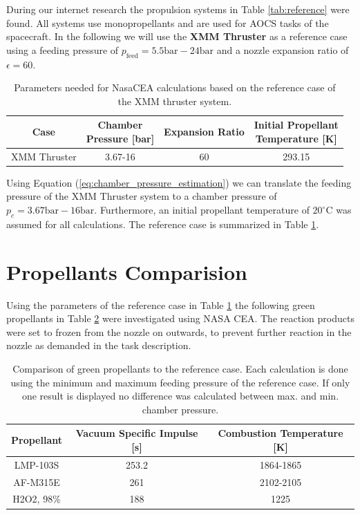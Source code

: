 \documentclass[12pt]{article}
\begin{document}
During our internet research the propulsion systems in Table \ref{tab:reference} were found. All systems use monopropellants and are used for AOCS tasks of the spacecraft. In the following we will use the \textbf{XMM Thruster} as a reference case using a feeding pressure of $p_{\text{feed}}=5.5\text{bar}-24\text{bar}$ and a nozzle expansion ratio of $\epsilon=60$.\\

\begin{table}[h!]
	\centering
	\begin{tabular}{|c|c|c|c|}
		\hline
		Case & \makecell{Chamber\\ Pressure {[}bar{]}} & Expansion Ratio & \makecell{Initial Propellant\\ Temperature {[}K{]}} \\ \hline
		XMM Thruster                      &        3.67-16         &  60   &              293.15                      \\ \hline
	\end{tabular}
	\caption{Parameters needed for NasaCEA calculations based on the reference case of the XMM thruster system.}
	\label{tab:selected_reference_case}
\end{table}

Using Equation (\ref{eq:chamber_pressure_estimation}) we can translate the feeding pressure of the XMM Thruster system to a chamber pressure of $p_{c}=3.67\text{bar}-16\text{bar}$. Furthermore, an initial propellant temperature of $20^\circ\text{C}$ was assumed for all calculations. The reference case is summarized in Table \ref{tab:selected_reference_case}.
 
\section{Propellants Comparision}
Using the parameters of the reference case in Table \ref{tab:selected_reference_case} the following green propellants in Table \ref{tab:comparison} were investigated using NASA CEA. The reaction products were set to frozen from the nozzle on outwards, to prevent further reaction in the nozzle as demanded in the task description.

\begin{table}[!h]
	\centering
	\begin{tabular}{|c|c|c|}
		\hline
		Propellant & Vacuum Specific Impulse {[}s{]} & Combustion Temperature {[}K{]} \\ \hline
		LMP-103S   & 253.2 & 1864-1865  \\ \hline
		AF-M315E   & 261  & 2102-2105  \\ \hline
		H2O2, 98\% & 188   & 1225    \\ \hline     
	\end{tabular}\\
	\caption{Comparison of green propellants to the reference case. Each calculation is done using the minimum and maximum feeding pressure of the reference case. If only one result is displayed no difference was calculated between max. and min. chamber pressure.}
	\label{tab:comparison}
\end{table}
\end{document}
